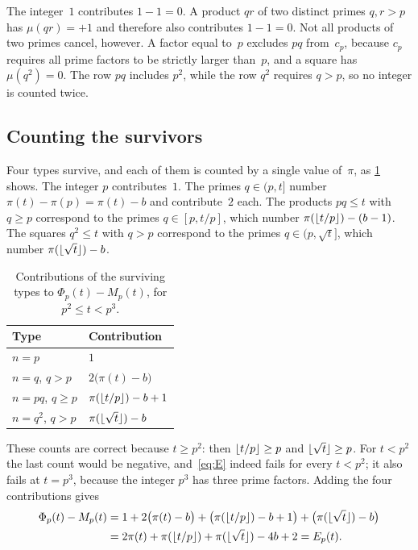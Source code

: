 \documentclass[11pt,a4paper]{amsart}
\numberwithin{equation}{section}
\DeclarePairedDelimiter{\floor}{\lfloor}{\rfloor}
\begin{document}
The integer~$1$ contributes $1-1=0$. A product $qr$ of two distinct primes
$q,r>p$ has $\mu(qr)=+1$ and therefore also contributes $1-1=0$. Not all
products of two primes cancel, however. A factor equal to~$p$ excludes $pq$
from~$c_p$, because $c_p$ requires all prime factors to be strictly larger
than~$p$, and a square has $\mu(q^2)=0$. The row $pq$ includes $p^2$, while the
row $q^2$ requires $q>p$, so no integer is counted twice.

\subsection{Counting the survivors}
Four types survive, and each of them is counted by a single value of~$\pi$, as
\cref{tab:survivors} shows. The integer $p$ contributes~$1$. The primes
$q\in(p,t]$ number $\pi(t)-\pi(p)=\pi(t)-b$ and contribute~$2$ each. The
products $pq\le t$ with $q\ge p$ correspond to the primes $q\in[p,t/p]$, which
number $\pi(\floor{t/p})-(b-1)$. The squares $q^2\le t$ with $q>p$ correspond to
the primes $q\in(p,\sqrt t]$, which number $\pi(\floor{\sqrt t})-b$.

\begin{table}[htb]
\caption{Contributions of the surviving types to $\Phi_p(t)-M_p(t)$, for
$p^2\le t<p^3$.}\label{tab:survivors}
\centering
\begin{tabular}{@{}ll@{}}
\toprule
Type & Contribution\\
\midrule
$n=p$ & $1$\\
$n=q$, $q>p$ & $2\bigl(\pi(t)-b\bigr)$\\
$n=pq$, $q\ge p$ & $\pi(\floor{t/p})-b+1$\\
$n=q^2$, $q>p$ & $\pi(\floor{\sqrt t})-b$\\
\bottomrule
\end{tabular}
\end{table}

These counts are correct because $t\ge p^2$: then $\floor{t/p}\ge p$ and
$\floor{\sqrt t}\ge p$. For $t<p^2$ the last count would be negative,
and~\eqref{eq:E} indeed fails for every $t<p^2$; it also fails at $t=p^3$,
because the integer $p^3$ has three prime factors. Adding the four
contributions gives
\[
\begin{split}
  \Phi_p(t)-M_p(t)&=1+2\bigl(\pi(t)-b\bigr)+\bigl(\pi(\floor{t/p})-b+1\bigr)
   +\bigl(\pi(\floor{\sqrt t})-b\bigr)\\
  &=2\pi(t)+\pi(\floor{t/p})+\pi(\floor{\sqrt t})-4b+2=E_p(t).
\end{split}
\]
\end{document}
